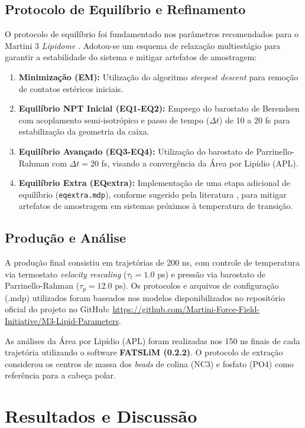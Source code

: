 \documentclass[12pt]{article} %
\begin{document}
\subsection{Protocolo de Equilíbrio e Refinamento}
O protocolo de equilíbrio foi fundamentado nos parâmetros recomendados para o Martini 3 \textit{Lipidome} \cite{pedersen2024}. Adotou-se um esquema de relaxação multiestágio para garantir a estabilidade do sistema e mitigar artefatos de amostragem:

\begin{enumerate}
    \item \textbf{Minimização (EM):} Utilização do algoritmo \textit{steepest descent} para remoção de contatos estéricos iniciais.
    \item \textbf{Equilíbrio NPT Inicial (EQ1-EQ2):} Emprego do barostato de Berendsen com acoplamento semi-isotrópico e passo de tempo ($\Delta t$) de 10 a 20 fs para estabilização da geometria da caixa.
    \item \textbf{Equilíbrio Avançado (EQ3-EQ4):} Utilização do barostato de Parrinello-Rahman com $\Delta t = 20$ fs, visando a convergência da Área por Lipídio (APL).
    \item \textbf{Equilíbrio Extra (EQextra):} Implementação de uma etapa adicional de equilíbrio (\texttt{eqextra.mdp}), conforme sugerido pela literatura \cite{pedersen2024}, para mitigar artefatos de amostragem em sistemas próximos à temperatura de transição.
\end{enumerate}

\subsection{Produção e Análise}
A produção final consistiu em trajetórias de 200 ns, com controle de temperatura via termostato \textit{velocity rescaling} ($\tau_t = 1.0$ ps) e pressão via barostato de Parrinello-Rahman ($\tau_p = 12.0$ ps). Os protocolos e arquivos de configuração (.mdp) utilizados foram baseados nos modelos disponibilizados no repositório oficial do projeto no GitHub: \url{https://github.com/Martini-Force-Field-Initiative/M3-Lipid-Parameters}.

As análises da Área por Lipídio (APL) foram realizadas nos 150 ns finais de cada trajetória utilizando o software \textbf{FATSLiM (0.2.2)}. O protocolo de extração considerou os centros de massa dos \textit{beads} de colina (NC3) e fosfato (PO4) como referência para a cabeça polar.

\section{Resultados e Discussão}
\end{document}
